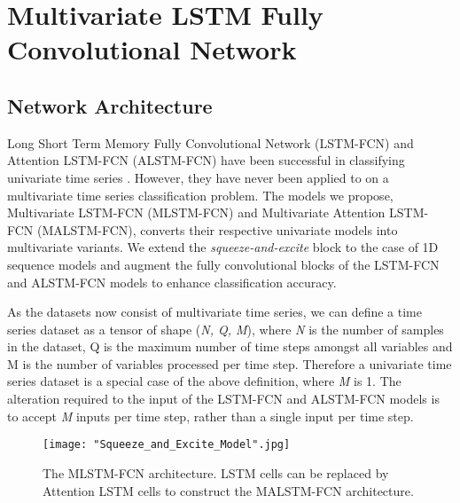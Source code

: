 \documentclass[preprint,12pt,3p]{elsarticle}
\begin{document}
 
\section{Multivariate LSTM Fully Convolutional Network}
\label{LSTMFCN}
\subsection{Network Architecture}

Long Short Term Memory Fully Convolutional Network (LSTM-FCN) and Attention LSTM-FCN (ALSTM-FCN) have been successful in classifying univariate time series \cite{karim2017lstm}. However, they have never been applied to on a multivariate time series classification problem. The models we propose, Multivariate LSTM-FCN (MLSTM-FCN) and Multivariate Attention LSTM-FCN (MALSTM-FCN), converts their respective univariate models into multivariate variants. We extend the \textit{squeeze-and-excite} block to the case of 1D sequence models and augment the fully convolutional blocks of the LSTM-FCN and ALSTM-FCN models to enhance classification accuracy.

As the datasets now consist of multivariate time series, we can define a time series dataset as a tensor of shape (\textit{N, Q, M}), where \textit{N} is the number of samples in the dataset, Q is the maximum number of time steps amongst all variables and M is the number of variables processed per time step. Therefore a univariate time series dataset is a special case of the above definition, where \textit{M} is 1. The alteration required to the input of the LSTM-FCN and ALSTM-FCN models is to accept \textit{M} inputs per time step, rather than a single input per time step.

\begin{figure*}[htpb]
\center
\texttt{[image: "Squeeze\_and\_Excite\_Model".jpg]}

\center
\caption{The MLSTM-FCN architecture. LSTM cells can be replaced by Attention LSTM cells to construct the MALSTM-FCN architecture.}
\label{fig:arch}

\end{figure*}
\end{document}
